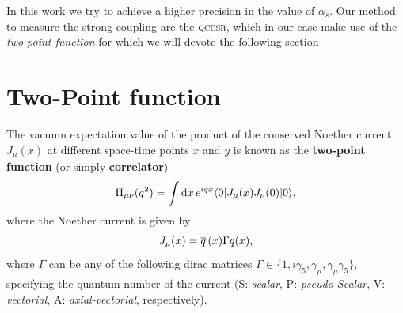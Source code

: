 \documentclass[../../index.tex]{subfiles}
\begin{document}
In this work we try to achieve a higher precision in the value of $\alpha_s$.
Our method to measure the strong coupling are the \textsc{qcdsr},
which in our case make use of the \textit{two-point function} for
which we will devote the following section
\section{Two-Point function}
\label{sec:twoPointFunction}


The vacuum expectation value of the product of the conserved Noether current
$J_\mu(x)$ at different space-time points $x$ and $y$ is known as the
\textbf{two-point function} (or simply \textbf{correlator})
\begin{equation}
  \label{eq:twoPointFunction}
  \Pi_{\mu\nu}(q^2) = \int \dif x \, e^{iqx} \langle  0 | J_\mu(x) J_\nu(0) | 0 \rangle,
\end{equation}
where the Noether current is given by
\begin{equation}
  \label{eq:qcdCurrent}
  J_\mu(x) = \overline{q}\,(x) \Gamma q(x),
\end{equation}
where $\Gamma$ can be any of the following dirac matrices $\Gamma \in \{ 1,
i\gamma_5, \gamma_\mu, \gamma_\mu\gamma_5\}$, specifying the quantum number of
the current (S: \textit{scalar}, P: \textit{pseudo-Scalar}, V:
\textit{vectorial}, A: \textit{axial-vectorial}, respectively).
\end{document}
